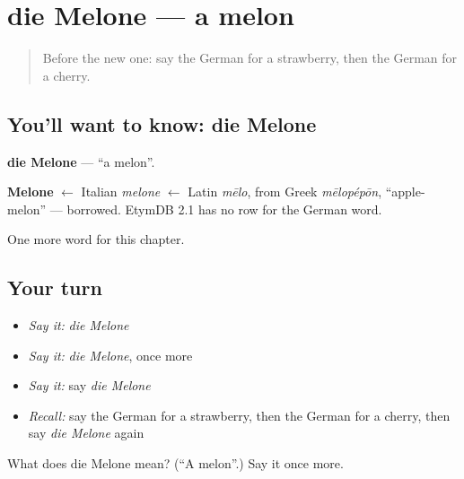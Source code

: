 \section[die Melone]{die Melone — a melon}

\label{lesson:GE-C121-melone}



\begin{quote}
Before the new one: say the German for a strawberry, then the German for a cherry.
\end{quote}

\subsection*{You'll want to know: die Melone}
\textbf{die Melone} — \textquotedblleft{}a melon\textquotedblright{}.

\begin{cousinweb}
\textbf{Melone} $\leftarrow$ Italian \emph{melone} $\leftarrow$ Latin \emph{mēlo}, from Greek \emph{mēlopépōn}, \textquotedblleft{}apple-melon\textquotedblright{} — borrowed. EtymDB 2.1 has no row for the German word.
\end{cousinweb}

\begin{grammarlens}[title={What you've built}]
One more word for this chapter.
\end{grammarlens}

\subsection*{Your turn}
\begin{itemize}
\raggedright
  \item \emph{Say it:} \emph{die Melone}
  \item \emph{Say it:} \emph{die Melone}, once more
  \item \emph{Say it:} say \emph{die Melone}
  \item \emph{Recall:} say the German for a strawberry, then the German for a cherry, then say \emph{die Melone} again
\end{itemize}

\begin{tcolorbox}[breakable,colback=teal!4,colframe=teal!35!black,title={Before you move on}]
What does die Melone mean? (\textquotedblleft{}A melon\textquotedblright{}.) Say it once more.
\end{tcolorbox}
